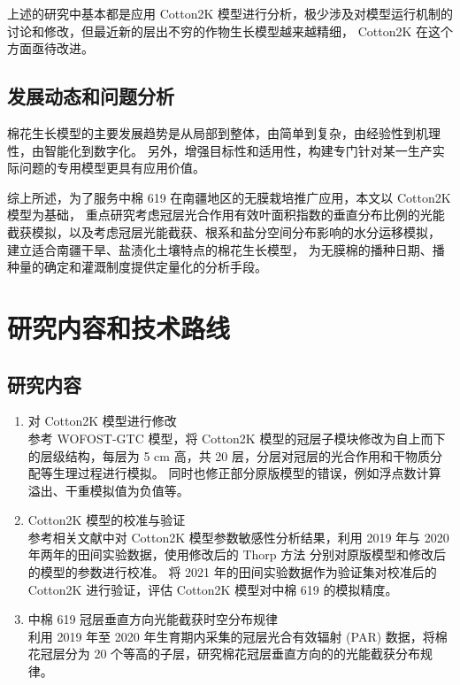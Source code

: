 上述的研究中基本都是应用 Cotton2K 模型进行分析，极少涉及对模型运行机制的讨论和修改，但最近新的层出不穷的作物生长模型越来越精细，%
Cotton2K 在这个方面亟待改进。

\subsection{发展动态和问题分析}
棉花生长模型的主要发展趋势是从局部到整体，由简单到复杂，由经验性到机理性，由智能化到数字化。%
另外，增强目标性和适用性，构建专门针对某一生产实际问题的专用模型更具有应用价值\cite{thorp2014}。

综上所述，为了服务中棉 619 在南疆地区的无膜栽培推广应用，本文以 Cotton2K 模型为基础，%
重点研究考虑冠层光合作用有效叶面积指数的垂直分布比例的光能截获模拟，以及考虑冠层光能截获、根系和盐分空间分布影响的水分运移模拟，%
建立适合南疆干旱、盐渍化土壤特点的棉花生长模型，
为无膜棉的播种日期、播种量的确定和灌溉制度提供定量化的分析手段。

\section{研究内容和技术路线}

\subsection{研究内容}
\begin{enumerate}
    \item 对 Cotton2K 模型进行修改\\%
          参考 WOFOST-GTC 模型，将 Cotton2K 模型的冠层子模块修改为自上而下的层级结构，每层为 5 cm 高，共 20 层，分层对冠层的光合作用和干物质分配等生理过程进行模拟。%
          同时也修正部分原版模型的错误，例如浮点数计算溢出、干重模拟值为负值等。
    \item Cotton2K 模型的校准与验证\\%
          参考相关文献中对 Cotton2K 模型参数敏感性分析结果，利用 2019 年与 2020 年两年的田间实验数据，使用修改后的 Thorp 方法\cite{thorp2019} 分别对原版模型和修改后的模型的参数进行校准。%
          将 2021 年的田间实验数据作为验证集对校准后的 Cotton2K 进行验证，评估 Cotton2K 模型对中棉 619 的模拟精度。
    \item 中棉 619 冠层垂直方向光能截获时空分布规律\\%
          利用 2019 年至 2020 年生育期内采集的冠层光合有效辐射 (PAR) 数据，将棉花冠层分为 20 个等高的子层，研究棉花冠层垂直方向的的光能截获分布规律。
\end{enumerate}

